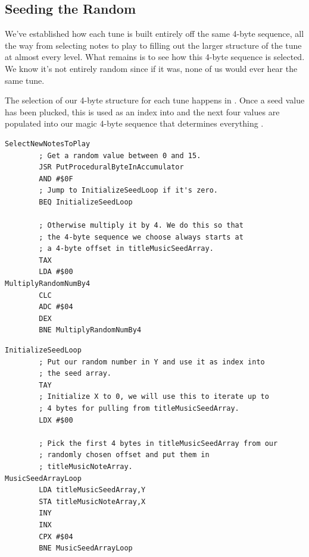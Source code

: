 \subsection{Seeding the Random}

We've established how each tune is built entirely off the same 4-byte sequence, all the way from selecting
notes to play to filling out the larger structure of the tune at almost every level. What remains is
to see how this 4-byte sequence is selected. We know it's not entirely random since if it was, none of us
would ever hear the same tune. 

The selection of our 4-byte structure for each tune happens in . Once a seed
value has been plucked, this is used as an index into  and the next four values
are populated into our magic 4-byte sequence that determines everything .

\begin{lstlisting}[caption=Put a seed byte in the accumulator and multiply this by 4 if it's not zero. This
gives us what we need for the next step.]
SelectNewNotesToPlay
        ; Get a random value between 0 and 15.
        JSR PutProceduralByteInAccumulator
        AND #$0F
        ; Jump to InitializeSeedLoop if it's zero.
        BEQ InitializeSeedLoop

        ; Otherwise multiply it by 4. We do this so that
        ; the 4-byte sequence we choose always starts at
        ; a 4-byte offset in titleMusicSeedArray.
        TAX
        LDA #$00
MultiplyRandomNumBy4   
        CLC
        ADC #$04
        DEX
        BNE MultiplyRandomNumBy4
\end{lstlisting}

\begin{lstlisting}[caption=Use our seed value to pull 4 bytes from \icode{titleMusicSeedArray} and
store them in \icode{titleMusicNoteArray}]
InitializeSeedLoop   
        ; Put our random number in Y and use it as index into
        ; the seed array.
        TAY
        ; Initialize X to 0, we will use this to iterate up to
        ; 4 bytes for pulling from titleMusicSeedArray.
        LDX #$00

        ; Pick the first 4 bytes in titleMusicSeedArray from our
        ; randomly chosen offset and put them in
        ; titleMusicNoteArray.
MusicSeedArrayLoop   
        LDA titleMusicSeedArray,Y
        STA titleMusicNoteArray,X
        INY
        INX
        CPX #$04
        BNE MusicSeedArrayLoop
\end{lstlisting}

